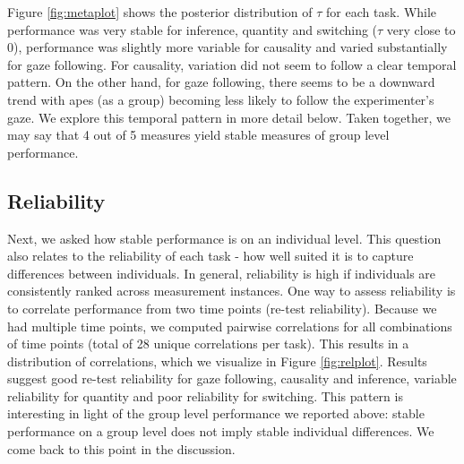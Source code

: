 \documentclass[10pt, letterpaper]{article}
\begin{document}
Figure \ref{fig:metaplot} shows the posterior distribution of \(\tau\)
for each task. While performance was very stable for inference, quantity
and switching (\(\tau\) very close to 0), performance was slightly more
variable for causality and varied substantially for gaze following. For
causality, variation did not seem to follow a clear temporal pattern. On
the other hand, for gaze following, there seems to be a downward trend
with apes (as a group) becoming less likely to follow the experimenter's
gaze. We explore this temporal pattern in more detail below. Taken
together, we may say that 4 out of 5 measures yield stable measures of
group level performance.

\hypertarget{reliability}{%
\subsection{Reliability}\label{reliability}}

Next, we asked how stable performance is on an individual level. This
question also relates to the reliability of each task - how well suited
it is to capture differences between individuals. In general,
reliability is high if individuals are consistently ranked across
measurement instances. One way to assess reliability is to correlate
performance from two time points (re-test reliability). Because we had
multiple time points, we computed pairwise correlations for all
combinations of time points (total of 28 unique correlations per task).
This results in a distribution of correlations, which we visualize in
Figure \ref{fig:relplot}. Results suggest good re-test reliability for
gaze following, causality and inference, variable reliability for
quantity and poor reliability for switching. This pattern is interesting
in light of the group level performance we reported above: stable
performance on a group level does not imply stable individual
differences. We come back to this point in the discussion.
\end{document}
